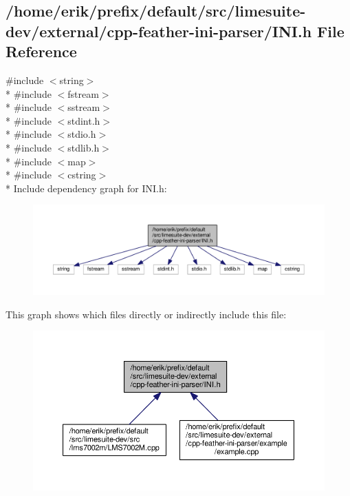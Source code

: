 \subsection{/home/erik/prefix/default/src/limesuite-\/dev/external/cpp-\/feather-\/ini-\/parser/\+I\+NI.h File Reference}
\label{INI_8h}
{\ttfamily \#include $<$string$>$}\\*
{\ttfamily \#include $<$fstream$>$}\\*
{\ttfamily \#include $<$sstream$>$}\\*
{\ttfamily \#include $<$stdint.\+h$>$}\\*
{\ttfamily \#include $<$stdio.\+h$>$}\\*
{\ttfamily \#include $<$stdlib.\+h$>$}\\*
{\ttfamily \#include $<$map$>$}\\*
{\ttfamily \#include $<$cstring$>$}\\*
Include dependency graph for I\+N\+I.\+h\+:
\nopagebreak
\begin{figure}[H]
\begin{center}
\leavevmode
\includegraphics[width=350pt]{de/d8d/INI_8h__incl}
\end{center}
\end{figure}
This graph shows which files directly or indirectly include this file\+:
\nopagebreak
\begin{figure}[H]
\begin{center}
\leavevmode
\includegraphics[width=350pt]{df/dbb/INI_8h__dep__incl}
\end{center}
\end{figure}
